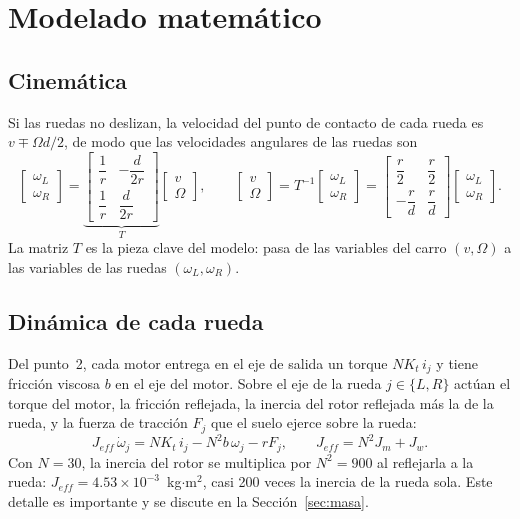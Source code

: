 \documentclass[11pt,letterpaper]{article}
\begin{document}
\section{Modelado matemático}
\subsection{Cinemática}
Si las ruedas no deslizan, la velocidad del punto de contacto de cada rueda es $v \mp \Omega d/2$, de modo que las velocidades angulares de las ruedas son
\begin{equation}
  \begin{bmatrix} \omega_L \\ \omega_R \end{bmatrix}
  = \underbrace{\begin{bmatrix} \dfrac{1}{r} & -\dfrac{d}{2r} \\[8pt] \dfrac{1}{r} & \dfrac{d}{2r} \end{bmatrix}}_{T}
  \begin{bmatrix} v \\ \Omega \end{bmatrix},
  \qquad
  \begin{bmatrix} v \\ \Omega \end{bmatrix}
  = T^{-1}\begin{bmatrix} \omega_L \\ \omega_R \end{bmatrix}
  = \begin{bmatrix} \dfrac{r}{2} & \dfrac{r}{2} \\[8pt] -\dfrac{r}{d} & \dfrac{r}{d} \end{bmatrix}
  \begin{bmatrix} \omega_L \\ \omega_R \end{bmatrix}.
  \label{eq:cinematica}
\end{equation}
La matriz $T$ es la pieza clave del modelo: pasa de las variables del carro $(v,\Omega)$ a las variables de las ruedas $(\omega_L,\omega_R)$.

\subsection{Dinámica de cada rueda}
Del punto~2, cada motor entrega en el eje de salida un torque $N K_t\, i_j$ y tiene fricción viscosa $b$ en el eje del motor. Sobre el eje de la rueda $j\in\{L,R\}$ actúan el torque del motor, la fricción reflejada, la inercia del rotor reflejada más la de la rueda, y la fuerza de tracción $F_j$ que el suelo ejerce sobre la rueda:
\begin{equation}
  J_{eff}\,\dot\omega_j = N K_t\, i_j - N^2 b\, \omega_j - r F_j ,
  \qquad J_{eff} = N^2 J_m + J_w .
  \label{eq:rueda}
\end{equation}
Con $N=30$, la inercia del rotor se multiplica por $N^2=900$ al reflejarla a la rueda: $J_{eff} = 4.53\times10^{-3}$~kg$\cdot$m$^2$, casi 200 veces la inercia de la rueda sola. Este detalle es importante y se discute en la Sección~\ref{sec:masa}.
\end{document}
